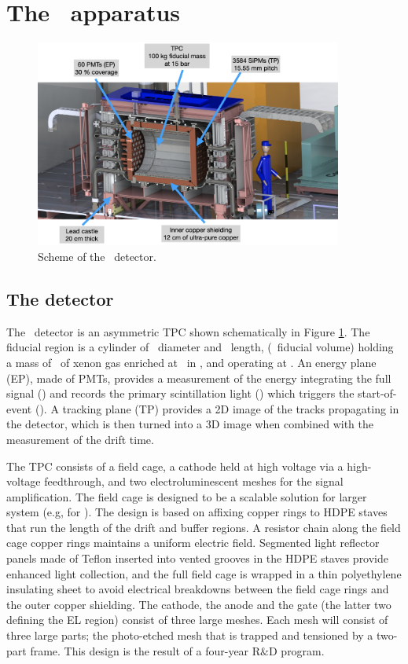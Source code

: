 \section{The \Next\ apparatus}
\label{sec.next100}

\begin{figure}[htbp!]
\centering
\includegraphics[width=0.9\textwidth]{img/NEXT-100-description.png}
\caption{\small Scheme of the \NEXT\ detector.}
\label{fig.next-100}
\end{figure}

\subsection{The detector}
The \Next\ detector is an asymmetric \HPXeEL TPC shown schematically in Figure \ref{fig.next-100}.  The fiducial region is a cylinder of \NextTpcDiameter\ diameter and \NextTpcLength\ length, (\NextFiducialVolume\ fiducial volume) holding a mass of \NextFiducialMass\ of xenon gas enriched at \XeEnrichment\ in \XE, and operating at \NextPressure.  An energy plane (EP),
made of PMTs, provides a measurement of the energy integrating the full signal (\stwo) and records the primary scintillation light (\sone) which triggers the start-of-event (\tz). A tracking plane (TP) provides a 2D image of the tracks propagating in the detector, which is then turned into a 3D image when combined with the measurement of the drift time.  

The TPC consists of a field cage, a cathode held at high voltage via a high-voltage feedthrough, and two electroluminescent meshes for the signal amplification.
The field cage is designed to be a scalable solution for larger system (e.g, for \NHD).  The design is based on affixing copper rings to HDPE staves that run the length of the drift and buffer regions.  
A resistor chain along the field cage copper rings maintains a uniform electric field. Segmented light reflector panels made of Teflon inserted into vented grooves in the HDPE staves provide enhanced light collection, and the full field cage is wrapped in a thin polyethylene insulating sheet to avoid electrical breakdowns between the field cage rings and the outer copper shielding.
The cathode, the anode and the gate (the latter two defining the EL region) consist of three large meshes.  Each mesh will consist of three large parts; the photo-etched mesh that is trapped and tensioned by a two-part frame. This design is the result of a four-year R$\&$D program.

